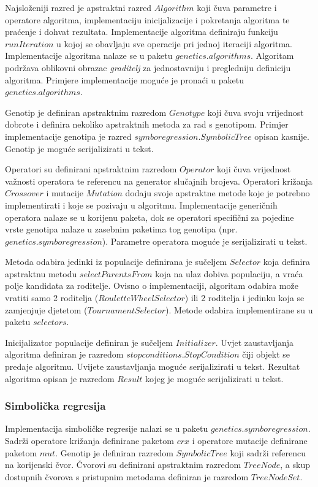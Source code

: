 \documentclass[times, utf8, numeric, diplomski]{fer}
\begin{document}
Najsloženiji razred je apstraktni razred $Algorithm$ koji čuva parametre i operatore algoritma, implementaciju inicijalizacije i pokretanja algoritma te praćenje i dohvat rezultata. Implementacije algoritma definiraju funkciju $runIteration$ u kojoj se obavljaju sve operacije pri jednoj iteraciji algoritma. Implementacije algoritma nalaze se u paketu $genetics.algorithms$. Algoritam podržava oblikovni obrazac \textit{graditelj} za jednostavniju i pregledniju definiciju algoritma. Primjere implementacije moguće je pronaći u paketu $genetics.algorithms$.

Genotip je definiran apstraktnim razredom $Genotype$ koji čuva svoju vrijednost dobrote i definira nekoliko apstraktnih metoda za rad s genotipom. Primjer implementacije genotipa je razred $symboregression.SymbolicTree$ opisan kasnije. Genotip je moguće serijalizirati u tekst.

Operatori su definirani apstraktnim razredom $Operator$ koji čuva vrijednost važnosti operatora te referencu na generator slučajnih brojeva. Operatori križanja $Crossover$ i mutacije $Mutation$ dodaju svoje apstraktne metode koje je potrebno implementirati i koje se pozivaju u algoritmu. Implementacije generičnih operatora nalaze se u korijenu paketa, dok se operatori specifični za pojedine vrste genotipa nalaze u zasebnim paketima tog genotipa (npr. $genetics.symboregression$). Parametre operatora moguće je serijalizirati u tekst.

Metoda odabira jedinki iz populacije definirana je sučeljem $Selector$ koja definira apstraktnu metodu $selectParentsFrom$ koja na ulaz dobiva populaciju, a vraća polje kandidata za roditelje. Ovisno o implementaciji, algoritam odabira može vratiti samo 2 roditelja ($RouletteWheelSelector$) ili 2 roditelja i jedinku koja se zamjenjuje djetetom ($TournamentSelector$). Metode odabira implementirane su u paketu $selectors$.

Inicijalizator populacije definiran je sučeljem $Initializer$. Uvjet zaustavljanja algoritma definiran je razredom $stopconditions.StopCondition$ čiji objekt se predaje algoritmu. Uvijete zaustavljanja moguće serijalizirati u tekst. Rezultat algoritma opisan je razredom $Result$ kojeg je moguće serijalizirati u tekst.

\subsubsection{Simbolička regresija}
Implementacija simboličke regresije nalazi se u paketu $genetics.symboregression$. Sadrži operatore križanja definirane paketom $crx$ i operatore mutacije definirane paketom $mut$. Genotip je definiran razredom $SymbolicTree$ koji sadrži referencu na korijenski čvor. Čvorovi su definirani apstraktnim razredom $TreeNode$, a skup dostupnih čvorova s pristupnim metodama definiran je razredom $TreeNodeSet$.
\end{document}
